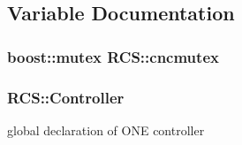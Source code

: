 \subsection{Variable Documentation}
\hypertarget{namespaceRCS_a021572a9d03c82d96029e82ea5691d60}{
\subsubsection[{cncmutex}]{\setlength{\rightskip}{0pt plus 5cm}boost\-::mutex R\-C\-S\-::cncmutex}}\label{namespaceRCS_a021572a9d03c82d96029e82ea5691d60}
\hypertarget{namespaceRCS_a9d517dc59f249be605546c3a36086b19}{
\subsubsection[{Controller}]{ R\-C\-S\-::\-Controller}}\label{namespaceRCS_a9d517dc59f249be605546c3a36086b19}
global declaration of O\-N\-E controller 